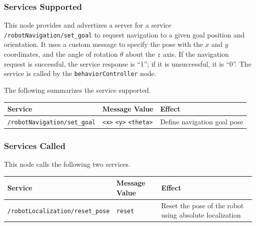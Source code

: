 \documentclass{CSSRforAfrica}
\begin{document}
{{\subsubsection*{Services Supported}
This node  provides and advertizes a server for a service {\small \verb+/robotNavigation/set_goal+} to request navigation to a given goal position and orientation. It uses a custom message to specify the pose with the $x$ and $y$ coordinates, and the angle of rotation $\theta$ about the  $z$ axis.  If the navigation request is successful, the service response is ``1''; if it is unsuccessful, it is ``0''.  
The service is called by  the {\small \verb+behaviorController+} node.

The following summarizes the service supported.

\begin{center}
\begin{tabularx}{\linewidth}{| l | l | X|}
\hline 
{\small Service }                                                                                & {\small Message Value}    &  {\small Effect}       \\
\hline
{\footnotesize \verb+/robotNavigation/set_goal+ }  & {\footnotesize \verb+<x>+ \verb+<y>+  \verb+<theta>+} & {\small Define navigation goal pose} \\ 
\hline
\end{tabularx}
\end{center}

\subsubsection*{Services Called}
This node  calls the following two services.

\begin{center}
\begin{tabularx}{\linewidth}{| l | l | X|}
\hline 
{\small Service }                                                    & {\small Message Value}    &  {\small Effect}       \\
\hline
{\footnotesize \verb+/robotLocalization/reset_pose+ }  &  {\footnotesize \verb+reset+} & {\small Reset the pose of the robot using absolute localization} \\ 
\hline
\end{tabularx}
\end{center}


}}
\end{document}
